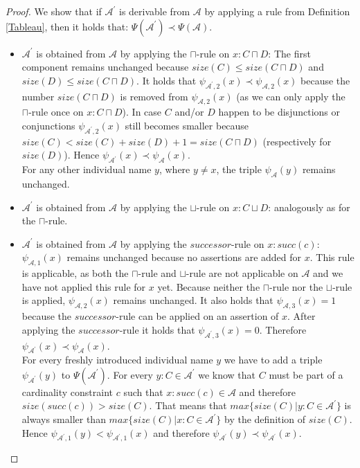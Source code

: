 \documentclass{book}
\theoremstyle{break}
\theoremstyle{definition}
\begin{document}
\begin{proof}
We show that if $\mathcal{A}^\prime$ is derivable from $\mathcal{A}$ by applying a rule from Definition \ref{Tableau}, then it holds that: $\Psi(\mathcal{A}^\prime)\prec \Psi(\mathcal{A})$.\\
\begin{itemize}
\item $\mathcal{A}^\prime$ is obtained from $\mathcal{A}$ by applying the $\sqcap$-rule on $x:C\sqcap D$: The first component remains unchanged because $size(C)\leq size(C\sqcap D)$ and $size(D)\leq size(C\sqcap D)$. It holds that $\psi_{\mathcal{A}^\prime,2}(x)\prec\psi_{\mathcal{A},2}(x)$ because the number $size(C\sqcap D)$ is removed from $\psi_{\mathcal{A},2}(x)$ (as we can only apply the $\sqcap$-rule once on $x:C\sqcap D$). In case $C$ and/or $D$ happen to be disjunctions or conjunctions $\psi_{\mathcal{A}^\prime,2}(x)$ still becomes smaller because $size(C)< size(C)+size(D)+1=size(C\sqcap D)$ (respectively for $size(D)$). Hence $\psi_{\mathcal{A}^\prime}(x)\prec\psi_{\mathcal{A}}(x)$.\\
For any other individual name $y$, where $y\neq x$, the triple $\psi_\mathcal{A}(y)$ remains unchanged.
\item $\mathcal{A}^\prime$ is obtained from $\mathcal{A}$ by applying the $\sqcup$-rule on $x:C\sqcup D$: analogously as for the $\sqcap$-rule.
\item $\mathcal{A}^\prime$ is obtained from $\mathcal{A}$ by applying the $successor$-rule on $x:succ(c)$: $\psi_{\mathcal{A},1}(x)$ remains unchanged because no assertions are added for $x$. This rule is applicable, as both the $\sqcap$-rule and $\sqcup$-rule are not applicable on $\mathcal{A}$ and we have not applied this rule for $x$ yet. Because neither the $\sqcap$-rule nor the $\sqcup$-rule is applied, $\psi_{\mathcal{A},2}(x)$ remains unchanged. It also holds that $\psi_{\mathcal{A},3}(x)=1$ because the $successor$-rule can be applied on an assertion of $x$. After applying the $successor$-rule it holds that $\psi_{\mathcal{A}^\prime,3}(x)=0$. Therefore $\psi_{\mathcal{A}^\prime}(x)\prec\psi_\mathcal{A}(x)$.\\
For every freshly introduced individual name $y$ we have to add a triple $\psi_{\mathcal{A}^\prime}(y)$ to $\Psi(\mathcal{A}^\prime)$. For every $y:C\in\mathcal{A}^\prime$ we know that $C$ must be part of a cardinality constraint $c$ such that $x:succ(c)\in\mathcal{A}$ and therefore $size(succ(c))>size(C)$. That means that $max\{size(C)|y:C\in\mathcal{A}^\prime\}$ is always smaller than $max\{size(C)|x:C\in\mathcal{A}^\prime\}$ by the definition of $size(C)$. Hence $\psi_{\mathcal{A}^\prime,1}(y)<\psi_{\mathcal{A}^\prime,1}(x)$ and therefore $\psi_{\mathcal{A}^\prime}(y)\prec\psi_{\mathcal{A}^\prime}(x)$.\\

\end{itemize}
\end{proof}
\end{document}
